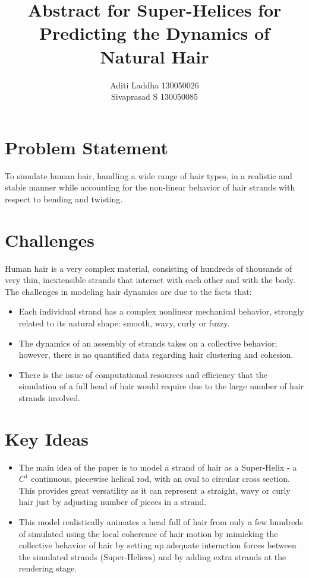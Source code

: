 \documentclass[paper=a4, fontsize=11pt]{scrartcl}
\title{Abstract for Super-Helices for Predicting the Dynamics of Natural Hair
}
\author{
		\normalsize Aditi Laddha 130050026\\
        \normalsize Sivaprasad S 130050085\\ \normalsize
}
\begin{document}
\maketitle
\section{Problem Statement}
To simulate human hair, handling a wide range of hair types, in a realistic and stable manner while accounting for the non-linear behavior of hair strands with respect to bending and twisting.

\section{Challenges}
Human hair is a very complex material, consisting of hundreds of thousands of very thin, inextensible strands that interact with each other and with the body. The challenges in modeling hair dynamics are due to the facts that:
\begin{itemize}
\item Each individual strand has a complex nonlinear mechanical behavior, strongly related to its natural shape: smooth, wavy, curly or fuzzy.
\item The dynamics of an assembly of strands takes on a collective behavior; however, there is no quantified data regarding hair clustering and cohesion.
\item There is the issue of computational resources and efficiency that the simulation of a full head of hair would require due to the large number of hair strands involved.
\end{itemize}

\section{Key Ideas}
\begin{itemize}
\item The main idea of the paper is to model a strand of hair as a Super-Helix - a $C^1$ continuous, piecewise helical rod, with an oval to circular cross section. This provides great versatility as it can represent a straight, wavy or curly hair just by adjusting number of pieces in a strand. 
\item This model realistically animates a head full of hair from only a few hundreds of simulated using the local coherence of hair motion by mimicking the collective behavior of hair by setting up adequate interaction forces between the simulated strands (Super-Helices) and by adding extra strands at the rendering stage.
\end{itemize}
\end{document}
